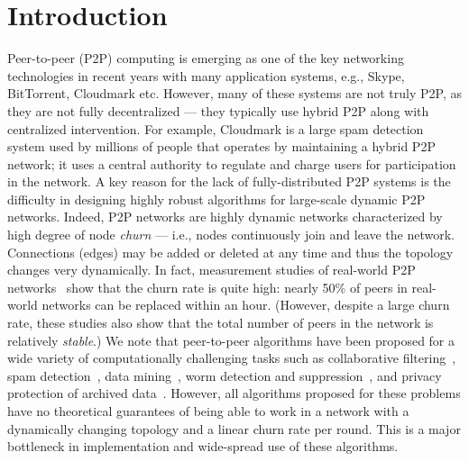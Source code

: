 \documentclass[leqno,11pt]{article}
\begin{document}
\section{Introduction}

Peer-to-peer (P2P) computing is emerging as one of the key networking technologies in recent years with many application systems, e.g., Skype, BitTorrent, Cloudmark etc. However, many of these  systems are not truly P2P, as they are not
fully decentralized --- they typically use hybrid P2P along with centralized intervention.
For example, Cloudmark  \cite{Cloudmark} is a large spam detection system used by millions of people that operates by maintaining
a hybrid P2P network; it uses a central authority to regulate and charge users for participation in the network.
A key reason for the lack of fully-distributed P2P systems is  the difficulty in designing highly robust algorithms for large-scale dynamic P2P networks. Indeed, P2P networks  are  highly dynamic  networks  characterized by  high degree of node {\em  churn}  --- i.e., nodes continuously join and leave the network. Connections (edges) may be added or deleted at any time and thus the topology changes very dynamically. In fact,  
measurement studies of real-world P2P networks~\cite{FPJKA07,SGG02,SW02, SR06} show that the churn rate is quite high:
nearly 50\% of peers in real-world networks can be replaced within an hour. (However,  despite a large churn rate, these studies  also show that the
total number of peers in the network is relatively {\em stable}.)  We note that peer-to-peer algorithms have been proposed
 for a wide variety
of  computationally challenging tasks such as collaborative
filtering~\cite{Canny02}, spam detection~\cite{Cloudmark},
data mining~\cite{DBGWK06}, worm detection and
suppression~\cite{MS05,VAS04}, and privacy protection of archived
data~\cite{GKLL09}. However, all algorithms proposed for these
problems have no theoretical guarantees of being able to
work in a network with a dynamically changing topology and a linear churn rate per round. This is  a major bottleneck in implementation and
wide-spread use of these algorithms.
\end{document}
